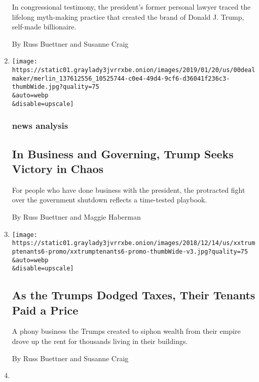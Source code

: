 \begin{enumerate}
  In congressional testimony, the president's former personal lawyer
  traced the lifelong myth-making practice that created the brand of
  Donald J. Trump, self-made billionaire.

  By Russ Buettner and Susanne Craig
\item
  \href{/2019/01/20/us/donald-trump-leadership-style.html}{}

  \texttt{[image: https://static01.graylady3jvrrxbe.onion/images/2019/01/20/us/00dealmaker/merlin\_137612556\_10525744-c0e4-49d4-9cf6-d36041f236c3-thumbWide.jpg?quality=75\\\&auto=webp\\\&disable=upscale]}

  \hypertarget{news-analysis}{%
  \subsubsection{news analysis}\label{news-analysis}}

  \hypertarget{in-business-and-governing-trump-seeks-victory-in-chaos}{%
  \subsection{In Business and Governing, Trump Seeks Victory in
  Chaos}\label{in-business-and-governing-trump-seeks-victory-in-chaos}}

  For people who have done business with the president, the protracted
  fight over the government shutdown reflects a time-tested playbook.

  By Russ Buettner and Maggie Haberman
\item
  \href{/2018/12/15/us/politics/trump-tenants-taxes.html}{}

  \texttt{[image: https://static01.graylady3jvrrxbe.onion/images/2018/12/14/us/xxtrumptenants6-promo/xxtrumptenants6-promo-thumbWide-v3.jpg?quality=75\\\&auto=webp\\\&disable=upscale]}

  \hypertarget{as-the-trumps-dodged-taxes-their-tenants-paid-a-price}{%
  \subsection{As the Trumps Dodged Taxes, Their Tenants Paid a
  Price}\label{as-the-trumps-dodged-taxes-their-tenants-paid-a-price}}

  A phony business the Trumps created to siphon wealth from their empire
  drove up the rent for thousands living in their buildings.

  By Russ Buettner and Susanne Craig
\item
  \href{/2018/10/04/us/politics/donald-trump-fred-trump-tax-schemes.html}{}


\end{enumerate}
